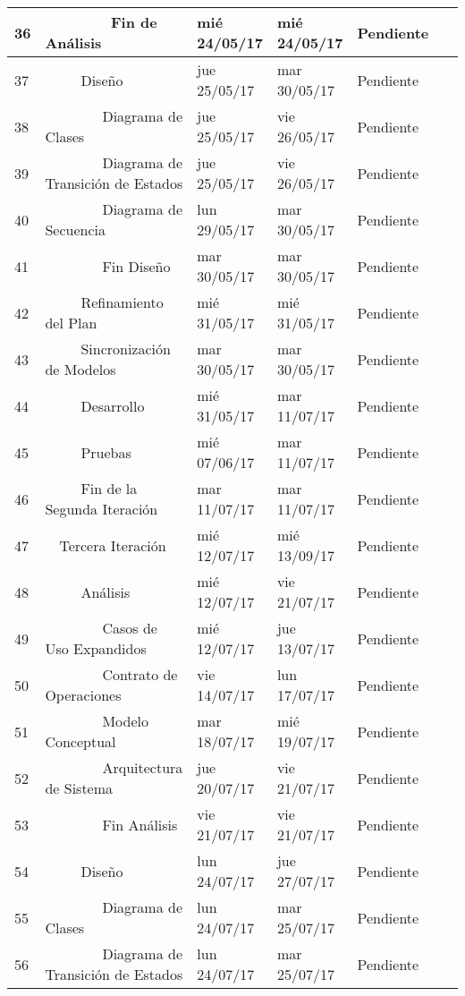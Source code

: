 \begin{center}
\begin{longtable}{ l l l l l l}
	36 &         Fin de Análisis & mié 24/05/17 & mié 24/05/17 & Pendiente & \  \\ \hline
	37 &      Diseño & jue 25/05/17 & mar 30/05/17 & Pendiente & \  \\ \hline
	38 &         Diagrama de Clases & jue 25/05/17 & vie 26/05/17 & Pendiente & \  \\ \hline
	39 &         Diagrama de Transición de Estados & jue 25/05/17 & vie 26/05/17 & Pendiente & \  \\ \hline
	40 &         Diagrama de Secuencia & lun 29/05/17 & mar 30/05/17 & Pendiente & \  \\ \hline
	41 &         Fin Diseño & mar 30/05/17 & mar 30/05/17 & Pendiente & \  \\ \hline
	42 &      Refinamiento del Plan & mié 31/05/17 & mié 31/05/17 & Pendiente & \  \\ \hline
	43 &      Sincronización de Modelos & mar 30/05/17 & mar 30/05/17 & Pendiente & \  \\ \hline
	44 &      Desarrollo & mié 31/05/17 & mar 11/07/17 & Pendiente & \  \\ \hline
	45 &      Pruebas & mié 07/06/17 & mar 11/07/17 & Pendiente & \  \\ \hline
	46 &      Fin de la Segunda Iteración & mar 11/07/17 & mar 11/07/17 & Pendiente & \  \\ \hline
	47 &   Tercera Iteración & mié 12/07/17 & mié 13/09/17 & Pendiente & \  \\ \hline
	48 &      Análisis & mié 12/07/17 & vie 21/07/17 & Pendiente & \  \\ \hline
	49 &         Casos de Uso Expandidos & mié 12/07/17 & jue 13/07/17 & Pendiente & \  \\ \hline
	50 &         Contrato de Operaciones & vie 14/07/17 & lun 17/07/17 & Pendiente & \  \\ \hline
	51 &         Modelo Conceptual & mar 18/07/17 & mié 19/07/17 & Pendiente & \  \\ \hline
	52 &         Arquitectura de Sistema & jue 20/07/17 & vie 21/07/17 & Pendiente & \  \\ \hline
	53 &         Fin Análisis & vie 21/07/17 & vie 21/07/17 & Pendiente & \  \\ \hline
	54 &      Diseño & lun 24/07/17 & jue 27/07/17 & Pendiente & \  \\ \hline
	55 &         Diagrama de Clases & lun 24/07/17 & mar 25/07/17 & Pendiente & \  \\ \hline
	56 &         Diagrama de Transición de Estados & lun 24/07/17 & mar 25/07/17 & Pendiente & \  \\ \hline

\end{longtable}
\end{center}
